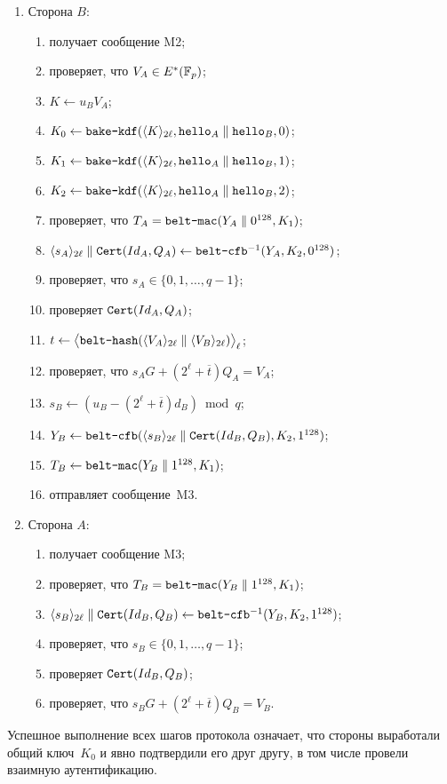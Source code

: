 \begin{enumerate}
\item
Сторона $B$:
\begin{enumerate}
\item
получает сообщение M2;
\item
проверяет, что $V_A\in E^*(\mathbb{F}_p)$;
\item
$K\leftarrow u_B V_A$;
\item
$K_0\leftarrow\texttt{bake-kdf}
(\langle K\rangle_{2\ell},\texttt{hello}_A\parallel\texttt{hello}_B,0)$;
\item
$K_1\leftarrow\texttt{bake-kdf}
(\langle K\rangle_{2\ell},\texttt{hello}_A\parallel\texttt{hello}_B,1)$;
\item
$K_2\leftarrow\texttt{bake-kdf}
(\langle K\rangle_{2\ell},\texttt{hello}_A\parallel\texttt{hello}_B,2)$;
\item
проверяет, 
что $T_A=\texttt{belt-mac}
(Y_A\parallel 0^{128}, K_1)$;
\item
$\langle s_A\rangle_{2\ell}\parallel\texttt{Cert}(Id_A,Q_A)
\leftarrow\texttt{belt-cfb}^{-1}(Y_A,K_2,0^{128})$;
\item
проверяет, что $s_A\in\{0,1,\ldots,q-1\}$;
\item
проверяет $\texttt{Cert}(Id_A,Q_A)$;
\item
$t\leftarrow\bigl\langle\texttt{belt-hash}
(\langle V_A\rangle_{2\ell}\parallel \langle V_B\rangle_{2\ell})
\bigr\rangle_\ell$;
\item
проверяет, что $s_A G+(2^\ell +\overline{t})Q_A=V_A$;
\item
$s_B\leftarrow (u_B-(2^\ell+\overline{t})d_B)\bmod q$;
\item
$Y_B\leftarrow\texttt{belt-cfb}
(\langle s_B\rangle_{2\ell}\parallel\texttt{Cert}(Id_B,Q_B),K_2,1^{128})$;
\item
$T_B\leftarrow\texttt{belt-mac}
(Y_B\parallel 1^{128}, K_1)$;
\item
отправляет сообщение~M3.
\end{enumerate}

\item
Сторона $A$:
\begin{enumerate}
\item
получает сообщение M3;
\item
проверяет, 
что $T_B=\texttt{belt-mac}
(Y_B\parallel 1^{128}, K_1)$;
\item
$\langle s_B\rangle_{2\ell}\parallel\texttt{Cert}(Id_B,Q_B)
\leftarrow\texttt{belt-cfb}^{-1}(Y_B,K_2,1^{128})$;
\item
проверяет, что $s_B\in\{0,1,\ldots,q-1\}$;
\item
проверяет $\texttt{Cert}(Id_B,Q_B)$;
\item
проверяет, что $s_B G+(2^\ell +\overline{t})Q_B=V_B$.
\end{enumerate}
\end{enumerate}

Успешное выполнение всех шагов протокола означает, что 
стороны выработали общий ключ~$K_0$ 
и явно подтвердили его друг другу, 
в том числе провели взаимную аутентификацию.

